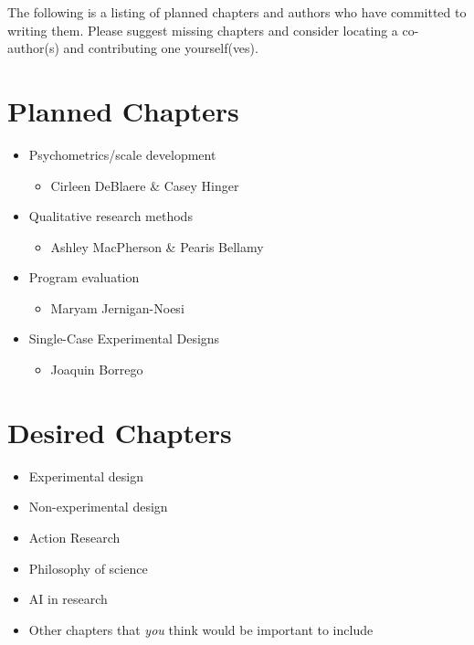 \documentclass[
  11pt,
]{book}
\providecommand{\tightlist}{%
  \setlength{\itemsep}{0pt}\setlength{\parskip}{0pt}}
\begin{document}
The following is a listing of planned chapters and authors who have committed to writing them. Please suggest missing chapters and consider locating a co-author(s) and contributing one yourself(ves).

\section{Planned Chapters}\label{planned-chapters}

\begin{itemize}
\tightlist
\item
  Psychometrics/scale development

  \begin{itemize}
  \tightlist
  \item
    Cirleen DeBlaere \& Casey Hinger
  \end{itemize}
\item
  Qualitative research methods

  \begin{itemize}
  \tightlist
  \item
    Ashley MacPherson \& Pearis Bellamy
  \end{itemize}
\item
  Program evaluation

  \begin{itemize}
  \tightlist
  \item
    Maryam Jernigan-Noesi
  \end{itemize}
\item
  Single-Case Experimental Designs

  \begin{itemize}
  \tightlist
  \item
    Joaquin Borrego
  \end{itemize}
\end{itemize}

\section{Desired Chapters}\label{desired-chapters}

\begin{itemize}
\tightlist
\item
  Experimental design
\item
  Non-experimental design
\item
  Action Research
\item
  Philosophy of science
\item
  AI in research
\item
  Other chapters that \emph{you} think would be important to include
\end{itemize}
\end{document}
